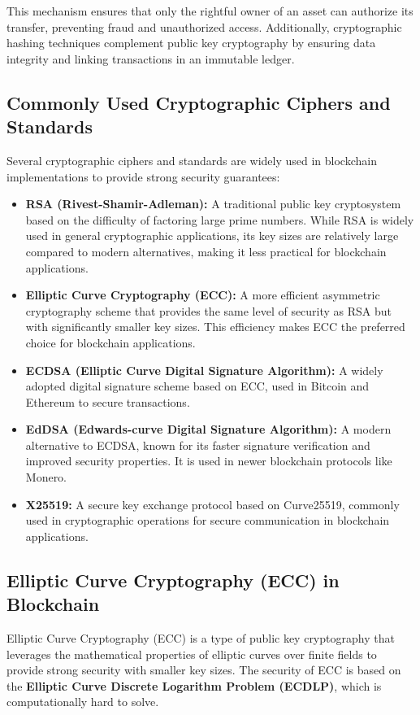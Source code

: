 \documentclass{article}
\begin{document}
This mechanism ensures that only the rightful owner of an asset can authorize its transfer, preventing fraud and unauthorized access. Additionally, cryptographic hashing techniques complement public key cryptography by ensuring data integrity and linking transactions in an immutable ledger.

\subsection*{Commonly Used Cryptographic Ciphers and Standards}
Several cryptographic ciphers and standards are widely used in blockchain implementations to provide strong security guarantees:

\begin{itemize}
    \item \textbf{RSA (Rivest-Shamir-Adleman):} A traditional public key cryptosystem based on the difficulty of factoring large prime numbers. While RSA is widely used in general cryptographic applications, its key sizes are relatively large compared to modern alternatives, making it less practical for blockchain applications.
    \item \textbf{Elliptic Curve Cryptography (ECC):} A more efficient asymmetric cryptography scheme that provides the same level of security as RSA but with significantly smaller key sizes. This efficiency makes ECC the preferred choice for blockchain applications.
    \item \textbf{ECDSA (Elliptic Curve Digital Signature Algorithm):} A widely adopted digital signature scheme based on ECC, used in Bitcoin and Ethereum to secure transactions.
    \item \textbf{EdDSA (Edwards-curve Digital Signature Algorithm):} A modern alternative to ECDSA, known for its faster signature verification and improved security properties. It is used in newer blockchain protocols like Monero.
    \item \textbf{X25519:} A secure key exchange protocol based on Curve25519, commonly used in cryptographic operations for secure communication in blockchain applications.
\end{itemize}

\subsection*{Elliptic Curve Cryptography (ECC) in Blockchain}
Elliptic Curve Cryptography (ECC) is a type of public key cryptography that leverages the mathematical properties of elliptic curves over finite fields to provide strong security with smaller key sizes. The security of ECC is based on the \textbf{Elliptic Curve Discrete Logarithm Problem (ECDLP)}, which is computationally hard to solve.
\end{document}
